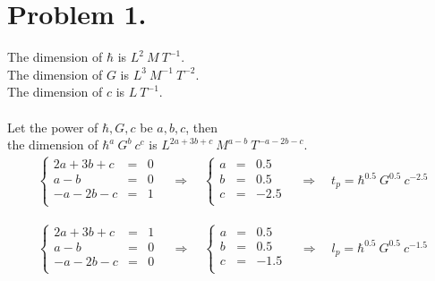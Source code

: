 \documentclass{article}
\begin{document}
\def\degree{${}^{\circ}$}

\[\]

\section*{Problem 1.}

The dimension of $\hbar$ is $L^{2}\ M\ T^{-1}$.\\
The dimension of $G$ is $L^{3}\ M^{-1}\ T^{-2}$.\\
The dimension of $c$ is $L\  T^{-1}$.\\
\\
Let the power of $\hbar, G, c$ be $a, b, c$, then\\
the dimension of $\hbar^{a}\ G^{b}\ c^{c}$ is $L^{2a+3b+c}\ M^{a-b}\ T^{-a-2b-c}$.\\
\begin{eqnarray*}
\left\{
\begin{array}{lll}
2a+3b+c&=&0\\
a-b&=&0\\
-a-2b-c&=&1\\
\end{array}
\right.\quad\Rightarrow\quad
\left\{
\begin{array}{lll}
a&=&0.5\\
b&=&0.5\\
c&=&-2.5\\
\end{array}
\right.\quad\Rightarrow\quad t_{p}=\hbar^{0.5}\ G^{0.5}\ c^{-2.5}
\end{eqnarray*} 

\begin{eqnarray*}
\left\{
\begin{array}{lll}
2a+3b+c&=&1\\
a-b&=&0\\
-a-2b-c&=&0\\
\end{array}
\right.\quad\Rightarrow\quad
\left\{
\begin{array}{lll}
a&=&0.5\\
b&=&0.5\\
c&=&-1.5\\
\end{array}
\right.\quad\Rightarrow\quad l_{p}=\hbar^{0.5}\ G^{0.5}\ c^{-1.5}
\end{eqnarray*}
\end{document}
